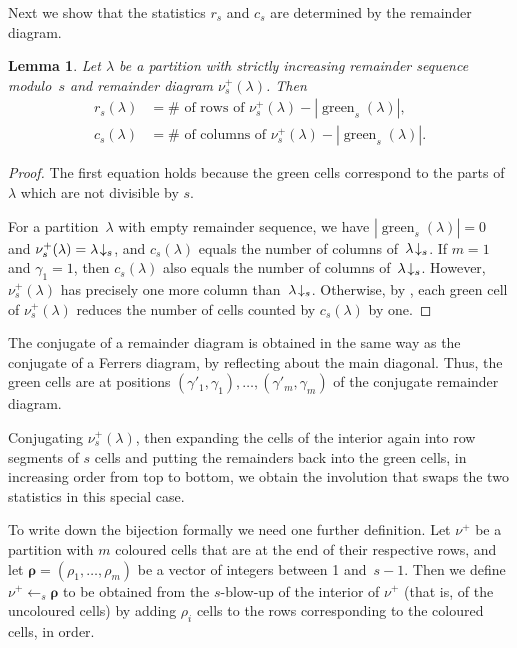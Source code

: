 \documentclass[12pt,reqno]{amsart}
\numberwithin{equation}{section}
\newtheorem{lemma}[theorem]{Lemma}
\theoremstyle{definition}
\DeclareMathOperator{\gout}{green}
\newcommand{\rem}{{\boldsymbol\rho}}
\newcommand{\posi}{{\gamma}}
\newcommand{\lab}[1]{\hbox{${\lambda}\!\downarrow_{#1}$}}
\begin{document}
Next we show that
the statistics $r_s$ and $c_s$ are determined by the remainder diagram.
\begin{lemma}\label{lem:increasing}
  Let $\lambda$ be a partition with strictly increasing remainder sequence modulo~$s$ and remainder diagram $\nu^+_s(\lambda)$.
  Then
  \begin{align*}
    r_s(\lambda) &= \# \text{ of rows of } \nu^+_s(\lambda)-|\gout_s(\lambda)|, \\
    c_s(\lambda) &= \# \text{ of columns of } \nu^+_s(\lambda)-|\gout_s(\lambda)|.
  \end{align*}
\end{lemma}
\begin{proof}
    The first equation holds because the green cells correspond to the parts of~$\lambda$ which are not divisible by $s$.

    For a partition~$\lambda$ with empty remainder sequence, we have $|\gout_s(\lambda)|=0$ and $\nu^+_s(\lambda) = \lab{s}$, and $c_s(\lambda)$ equals the number of columns of~$\lab{s}$. If $m=1$ and $\posi_1=1$, then $c_s(\lambda)$ also equals the number of columns of~$\lab{s}$.  However, $\nu^+_s(\lambda)$ has precisely one more column than~$\lab{s}$.  Otherwise, by , each green cell of $\nu^+_s(\lambda)$ reduces the number of cells counted by $c_s(\lambda)$ by one.
\end{proof}


The conjugate of a remainder diagram is obtained in the same way as the conjugate of a Ferrers diagram, by reflecting about the main diagonal.  Thus, the green cells are at positions $(\posi'_1, \posi_1),\dots,(\posi'_m, \posi_m)$ of the conjugate remainder diagram.

Conjugating $\nu_s^+(\lambda)$, then expanding the cells of the interior again into row segments of $s$ cells and putting the remainders back into the green cells, in increasing order from top to bottom, we obtain the involution that swaps the two statistics in this special case.

To write down the bijection formally we need one further definition.  Let $\nu^+$ be a partition with $m$ coloured cells that are at the end of their respective rows, and let $\rem=(\rho_1,\dots,\rho_m)$ be a vector of integers between 1 and~$s-1$.  Then we define $\nu^+ \leftarrow_s \rem$ to be obtained from the $s$-blow-up of the interior of $\nu^+$
(that is, of the uncoloured cells) by adding $\rho_i$ cells to the rows corresponding to the coloured cells, in order.  
\end{document}
